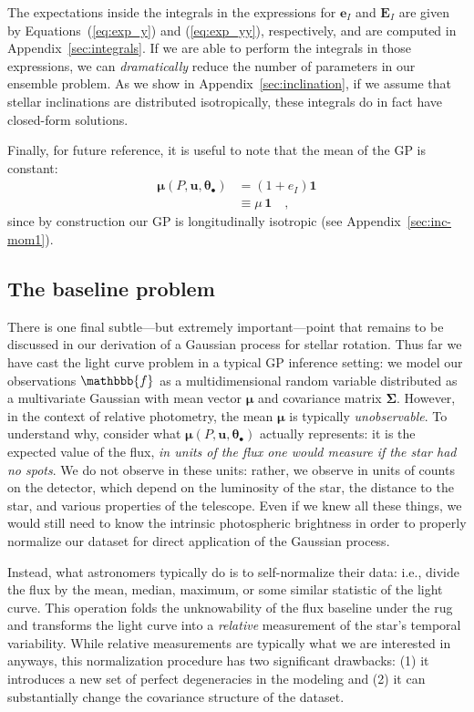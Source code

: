 \documentclass[modern]{aastex62}
\begin{document}
%
The expectations inside the integrals in the expressions for
$\mathbf{e}_I$ and $\mathbf{E}_I$
are given by
Equations~(\ref{eq:exp_y}) and (\ref{eq:exp_yy}), respectively, and
are computed in Appendix~\ref{sec:integrals}.
%
If we are able to perform the integrals in those expressions,
we can \emph{dramatically} reduce the number of
parameters in our ensemble problem.
%
As we show in Appendix~\ref{sec:inclination}, if we assume that stellar
inclinations are distributed isotropically, these integrals
do in fact have closed-form solutions.

%
Finally, for future reference, it is useful to note that the mean of the GP
is constant:
%
\begin{align}
    \label{eq:scalar-mean}
    \pmb{\mu}(P, \mathbf{u}, \pmb{\theta}_\bullet)
     & =  (1 + e_I)\mathbf{1}
    \nonumber                 \\
     & \equiv
    \mu \, \mathbf{1}
    \quad,
\end{align}
%
since by construction our GP is longitudinally isotropic
(see Appendix~\ref{sec:inc-mom1}).

\subsection{The baseline problem}
\label{sec:baseline}

There is one final subtle---but extremely important---point that remains to
be discussed in our derivation of a Gaussian process for stellar
rotation. Thus far we have cast the light curve problem in a typical GP inference
setting: we model our observations $\mathbbb{f}$ as
a multidimensional random variable distributed as a multivariate Gaussian with mean vector
$\pmb{\mu}$ and covariance matrix $\pmb{\Sigma}$. However, in the context of
relative photometry, the mean $\pmb{\mu}$ is typically \emph{unobservable}.
%
To understand why, consider what
$\pmb{\mu}(P, \mathbf{u}, \pmb{\theta}_\bullet)$ actually represents:
it is the expected value
of the flux,
\emph{in units of the flux one would measure if the star had no spots}.
We do not observe in these units: rather, we observe in units of counts on
the detector, which depend on the luminosity of the star, the distance to
the star, and various properties of the telescope. Even if we knew all these
things, we would still need to know the intrinsic photospheric brightness
in order to properly normalize our dataset for direct application of
the Gaussian process.

Instead, what astronomers typically do is to self-normalize their data:
i.e., divide the flux by the mean, median, maximum, or some similar
statistic of the light curve. This operation folds the unknowability of
the flux baseline under the rug and transforms the light curve into a \emph{relative}
measurement of the star's temporal variability. While relative measurements
are typically what we are interested in anyways, this normalization procedure
has two significant drawbacks: (1) it introduces a new set of perfect degeneracies
in the modeling and (2) it can substantially change the covariance structure
of the dataset.
\end{document}

